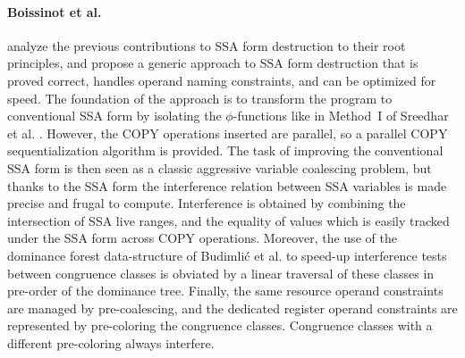 \paragraph{Boissinot et al. \cite{Boissinot:2009:CGO}} analyze the previous
contributions to SSA form destruction to their root principles, and propose a
generic approach to SSA form destruction that is proved correct, handles
operand naming constraints, and can be optimized for speed. The foundation of
the approach is to transform the program to conventional SSA form by isolating
the $\phi$-functions like in Method~I of Sreedhar et al.
\cite{Sreedhar:1999:SAS}.  However, the COPY operations inserted are parallel,
so a parallel COPY sequentialization algorithm is provided. The task of
improving the conventional SSA form is then seen as a classic aggressive
variable coalescing problem, but thanks to the SSA form the
interference relation between SSA variables is made precise and frugal to
compute.  Interference is obtained by combining the intersection of SSA live
ranges, and the equality of values which is easily tracked under the SSA form
across COPY operations. Moreover, the use of the dominance forest data-structure
of Budimli\'c et al.  \cite{Budimlic:2002:PLDI} to speed-up interference tests
between congruence classes is obviated by a linear traversal of these classes in
pre-order of the dominance tree. Finally, the same resource operand constraints
are managed by pre-coalescing, and the dedicated register operand constraints
are represented by pre-coloring the congruence classes. Congruence classes with
a different pre-coloring always interfere.




%


